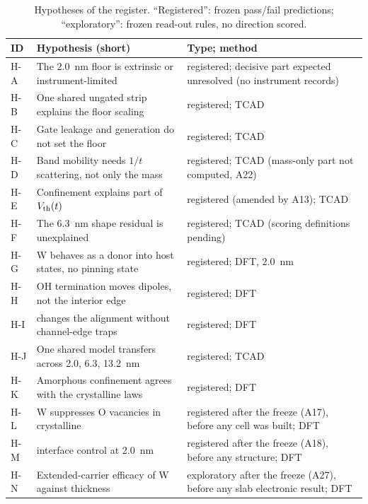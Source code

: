 \begin{table}[htbp]\centering\footnotesize
\caption{Hypotheses of the register. ``Registered'': frozen pass/fail predictions; ``exploratory'': frozen read-out
rules, no direction scored.}
\label{tab:m-reg-hyp}
\begin{tabularx}{\linewidth}{@{}l>{\raggedright\arraybackslash}X>{\raggedright\arraybackslash}p{4.0cm}@{}}
\toprule
ID & Hypothesis (short) & Type; method \\
\midrule
H-A & The \SI{2.0}{nm} floor is extrinsic or instrument-limited & registered; decisive part expected unresolved (no instrument records) \\ %
H-B & One shared ungated strip explains the floor scaling & registered; TCAD \\ %
H-C & Gate leakage and generation do not set the floor & registered; TCAD \\ %
H-D & Band mobility needs $1/t$ scattering, not only the mass & registered; TCAD (mass-only part not computed, A22) \\ %
H-E & Confinement explains part of $V_{\mathrm{th}}(t)$ & registered (amended by A13); TCAD \\ %
H-F & The \SI{6.3}{nm} shape residual is unexplained & registered; TCAD (scoring definitions pending) \\ %
H-G & W behaves as a donor into host states, no pinning state & registered; DFT, \SI{2.0}{nm} \\ %
H-H & OH termination moves dipoles, not the interior edge & registered; DFT \\ %
H-I & \AlO{} changes the alignment without channel-edge traps & registered; DFT \\ %
H-J & One shared model transfers across 2.0, 6.3, \SI{13.2}{nm} & registered; TCAD \\ %
H-K & Amorphous confinement agrees with the crystalline laws & registered; DFT \\ %
H-L & W suppresses O vacancies in crystalline \InO{} & registered after the freeze (A17), before any cell was built; DFT \\ %
H-M & \HfO{} interface control at \SI{2.0}{nm} & registered after the freeze (A18), before any structure; DFT \\ %
H-N & Extended-carrier efficacy of W against thickness & exploratory after the freeze (A27), before any slab electronic result; DFT \\ %
\bottomrule
\end{tabularx}
\end{table}

